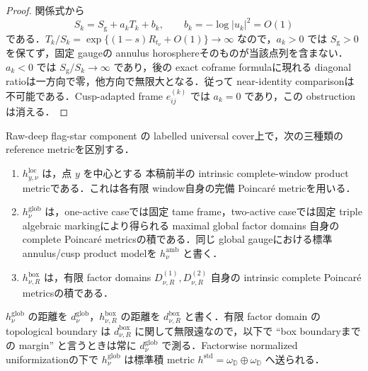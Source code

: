 \documentclass[a4paper,11pt]{ltjsarticle}
\numberwithin{equation}{section}
\theoremstyle{plain}
\theoremstyle{definition}
\theoremstyle{remark}
\begin{document}
\begin{proof}
関係式から
\[
 S_k=S_{\mathrm g}+a_kT_k+b_k,
 \qquad b_k=-\log|u_k|^2=O(1)
\]
である．$T_k/S_k=\exp\{(1-s)R_{t_\nu}+O(1)\}\to\infty$ なので，$a_k>0$ では $S_{\mathrm g}>0$ を保てず，固定 gaugeの annulus horosphereそのものが当該点列を含まない．$a_k<0$ では $S_{\mathrm g}/S_k\to\infty$ であり，後の exact coframe formulaに現れる diagonal ratioは一方向で零，他方向で無限大となる．従って near-identity comparisonは不可能である．Cusp-adapted frame $e^{(k)}_{ij}$ では $a_k=0$ であり，この obstructionは消える．
\end{proof}

\begin{definition}\label{sharp:def:three-product-metrics}
Raw-deep flag-star component の labelled universal cover上で，次の三種類の reference metricを区別する．
\begin{enumerate}[label=\textup{(M\arabic*)}]
\item $h^{\mathrm{loc}}_{y,\nu}$ は，点 $y$ を中心とする 本稿前半の intrinsic complete-window product metricである．これは各有限 window自身の完備 Poincar\'e metricを用いる．
\item $h^{\mathrm{glob}}_{\nu}$ は，one-active caseでは固定 tame frame，two-active caseでは固定 triple algebraic markingにより得られる maximal global factor domains 自身の complete Poincar\'e metricsの積である．同じ global gaugeにおける標準 annulus/cusp product modelを $h^{\mathrm{amb}}_{\nu}$ と書く．
\item $h^{\mathrm{box}}_{\nu,R}$ は，有限 factor domains $D^{(1)}_{\nu,R},D^{(2)}_{\nu,R}$ 自身の intrinsic complete Poincar\'e metricsの積である．
\end{enumerate}
$h^{\mathrm{glob}}_\nu$ の距離を $d^{\mathrm{glob}}_\nu$，$h^{\mathrm{box}}_{\nu,R}$ の距離を $d^{\mathrm{box}}_{\nu,R}$ と書く．有限 factor domain の topological boundary は $d^{\mathrm{box}}_{\nu,R}$ に関して無限遠なので，以下で ``box boundaryまでの margin'' と言うときは常に $d^{\mathrm{glob}}_\nu$ で測る．Factorwise normalized uniformizationの下で $h^{\mathrm{glob}}_\nu$ は標準積 metric $h^{\mathrm{std}}=\omega_{\mathbb D}\oplus\omega_{\mathbb D}$ へ送られる．
\end{definition}
\end{document}
